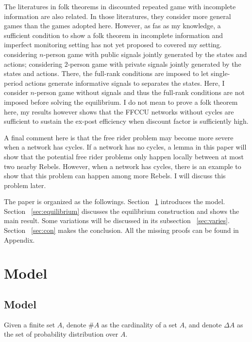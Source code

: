 \documentclass[12pt,letter]{article}
\theoremstyle{definition}
\theoremstyle{remark}
\theoremstyle{claim}
\begin{document}
The literatures in folk theorems in discounted repeated game with incomplete information are also related. In those literatures, they consider more general games than the games adopted here. However, as fas as my knowledge, a sufficient condition to show a folk theorem in incomplete information and imperfect monitoring setting has not yet proposed to covered my setting. \citep{Fudenberg2010} \citep{Fudenberg2011} \citep{Wiseman2012} considering $n$-person game with public signals jointly generated by the states and actions; \citep{Yamamoto2014} considering $2$-person game with private signals jointly generated by the states and actions. There, the full-rank conditions are imposed to let single-period actions generate informative signals to separates the states. Here, I consider $n$-person game without signals and thus the full-rank conditions are not imposed before solving the equilibrium.  I do not mean to prove a folk theorem here, my results however shows that the FFCCU networks without cycles are sufficient to sustain the ex-post efficiency when discount factor is sufficiently high. 

A final comment here is that the free rider problem may become more severe when a network has cycles. If a network has no cycles, a lemma in this paper will show that the potential free rider problems only happen locally between at most two nearby Rebels. However, when a network has cycles, there is an example to show that this problem can happen among more Rebels. I will discuss this problem later.

The paper is organized as the followings. Section ~\ref{sec:model} introduces the model. Section ~\ref{sec:equilibrium} discusses the equilibrium construction and shows the main result. Some variations will be discussed in its subsection ~\ref{sec:varies}. Section ~\ref{sec:con} makes the conclusion. All the missing proofs can be found in Appendix.

\section{Model}
\label{sec:model}
\subsection{Model}
Given a finite set $A$, denote $\#A$ as the cardinality of a set $A$, and denote $\Delta A$ as the set of probability distribution over $A$.
\end{document}
